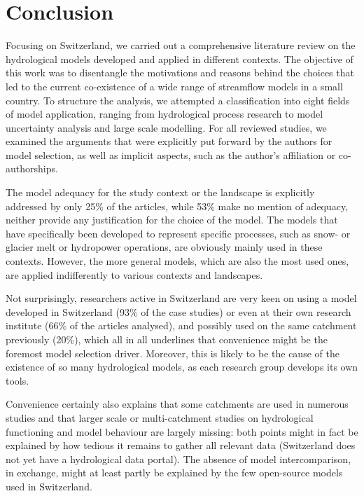 \documentclass[10pt,a4paper]{article}
\begin{document}


\section{Conclusion}
\label{sec:conclusion}

Focusing on Switzerland, we carried out a comprehensive literature review on the hydrological models developed and applied in different contexts. The objective of this work was to disentangle the motivations and reasons behind the choices that led to the current co-existence of a wide range of streamflow models in a small country. To structure the analysis, we attempted a classification into eight fields of model application, ranging from hydrological process research to model uncertainty analysis and large scale modelling. For all reviewed studies, we examined the arguments that were explicitly put forward by the authors for model selection, as well as implicit aspects, such as the author's affiliation or co-authorships. 

The model adequacy for the study context or the landscape is explicitly addressed by only 25\% of the articles, while 53\% make no mention of adequacy, neither provide any justification for the choice of the model. The models that have specifically been developed to represent specific processes, such as snow- or glacier melt or hydropower operations, are obviously mainly used in these contexts. However, the more general models, which are also the most used ones, are applied indifferently to various contexts and landscapes.

Not surprisingly, researchers active in Switzerland are very keen on using a model developed in Switzerland (93\% of the case studies) or even at their own research institute (66\% of the articles analysed), and possibly used on the same catchment previously (20\%), which all in all underlines that convenience might be the foremost model selection driver. Moreover, this is likely to be the cause of the existence of so many hydrological models, as each research group develops its own tools.

Convenience certainly also explains that some catchments are used in numerous studies and that larger scale or multi-catchment studies on hydrological functioning and model behaviour are largely missing: both points might in fact be explained by how tedious it remains to gather all relevant data (Switzerland does not yet have a hydrological data portal). The absence of model intercomparison, in exchange, might at least partly be explained by the few open-source models used in
Switzerland. 
\end{document}
